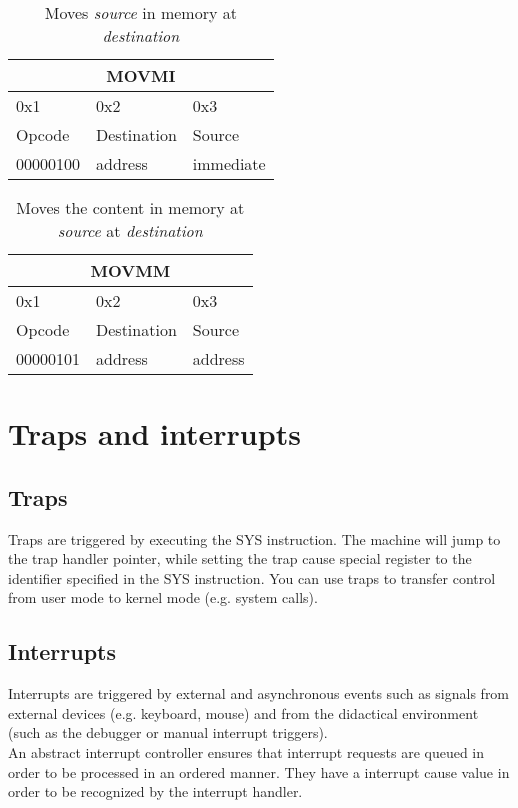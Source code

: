 \documentclass{article}
\begin{document}
\begin{table}[h!]
  \centering
  \begin{tabular} { | p{2cm} | | p{2cm} | p{2cm} |}
    \hline
    \multicolumn{3}{|c|}{MOVMI}\\
    \hline
    0x1 & 0x2 & 0x3\\
    \hline
    Opcode & Destination & Source\\
    00000100 & address & immediate\\
    \hline
  \end{tabular}
  \caption{Moves \textit{source} in memory at \textit{destination}}
\end{table}

\begin{table}[h!]
  \centering
  \begin{tabular} { | p{2cm} | | p{2cm} | p{2cm} |}
    \hline
    \multicolumn{3}{|c|}{MOVMM}\\
    \hline
    0x1 & 0x2 & 0x3\\
    \hline
    Opcode & Destination & Source\\
    00000101 & address & address\\
    \hline
  \end{tabular}
  \caption{Moves the content in memory at \textit{source} at \textit{destination}}
\end{table}

\section{Traps and interrupts}
\subsection{Traps}
Traps are triggered by executing the SYS instruction. The machine will jump to the trap handler pointer, while setting the trap cause special register to the identifier specified in the SYS instruction. You can use traps to transfer control from user mode to kernel mode (e.g. system calls).
\subsection{Interrupts}
Interrupts are triggered by external and asynchronous events such as signals from external devices (e.g. keyboard, mouse) and from the didactical environment (such as the debugger or manual interrupt triggers). \\An abstract interrupt controller ensures that interrupt requests are queued in order to be processed in an ordered manner. They have a interrupt cause value in order to be recognized by the interrupt handler.
\end{document}
